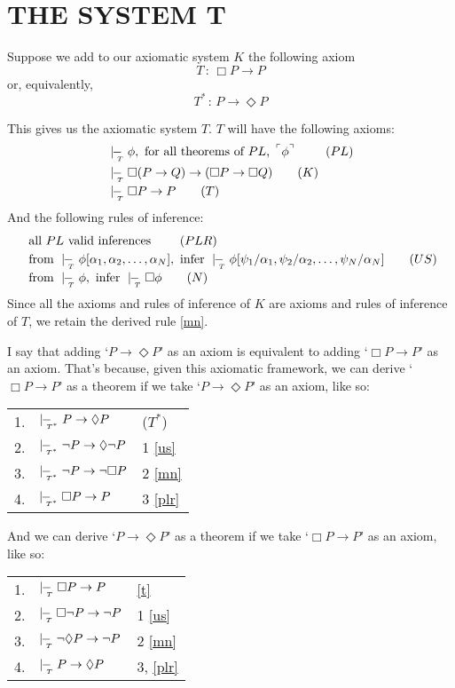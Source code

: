 \documentclass[landscape, two column, full page,reqno]{article}
\newcommand{\p}{\item}
\newcommand{\fns}[1]{{\footnotesize #1}}
\newcommand{\qq}[1]{ ~\!^\ulcorner #1  ^\urcorner~\!}
\newcommand{\tproves}{\mid\hspace{-3.9pt}-_{\!\!\!\raisebox{-3pt}{\text{\tiny$T$}}}\hspace{3pt}}
\newcommand{\tpproves}{\mid\hspace{-3.9pt}-_{\!\!\!\raisebox{-3pt}{\text{\tiny$T^*$}}}\hspace{3pt}}
\newcommand{\D}{\Diamond}
\newcommand{\B}{\Box}
\newcommand{\hs}{\hspace{2pt}}
\newcommand{\aproof}[2]{\begin{center}
\begin{tabularx}{#1}{l X l}
#2
\end{tabularx}
\end{center}}
\begin{document}
\section{T\fns{HE} S\fns{YSTEM} T}
\p Suppose we add to our axiomatic system  $K$ the following axiom
	\[
	T \hs:\hs \B P \to P
	\]
or, equivalently,	
	\[
	T^* \hs:\hs P \to \D P
	\]
	
\p This gives us the axiomatic system ${T}$.     $T$ will have the following axioms:
		\begin{align}
		& \tproves \phi, \text{ for all theorems of $PL$, $\qq{\phi}$ }			\tag{$PL$}\label{plt}	\\
		& \tproves\B( P \to Q) \to (\B P \to \B Q)	\tag{$K$}\label{k}	\\
		& \tproves \B P \to P			\tag{$T$} \label{t}	
		 \end{align}
And the following rules of inference:
		\begin{align}
		&\text{ all $PL$ valid inferences }	\tag{$PLR$}\label{plr}	\\
		&\text{ from } \tproves \phi[\alpha_1, \alpha_2, \dots, \alpha_N] , \text{ infer } \tproves \phi [\psi_1/\alpha_1, \psi_2/\alpha_2, \dots, \psi_N/\alpha_N]	\tag{$US$}\label{us}\\
		& \mbox{ from } \tproves \phi, \mbox{ infer } \tproves \B \phi \tag{$N$}\label{n}
		\end{align}
	Since all the axioms and rules of inference of $K$ are axioms and rules of inference of $T$, we retain the derived rule \eqref{mn}.
		
\p \label{31} I say that adding `$P \to \D P$' as an axiom is equivalent to adding `$\B P \to P$' as an axiom.  That's because, given this axiomatic framework, we can derive `$\B P \to P$' as a theorem if we take `$P \to \D P$' as an axiom, like so:
	\aproof{250pt}{
	1. & $\tpproves P \to \D P$				&	($T^*$)	\\
	2. & $\tpproves \neg P \to \D \neg P$		& 1 \eqref{us}	\\
	3. & $\tpproves \neg P \to \neg \B P$		& 2 \eqref{mn}	\\
	4. & $\tpproves \B P \to P$				& 3 \eqref{plr}
	}
And we can derive `$P \to \D P$' as a theorem if we take `$\B P \to P$' as an axiom, like so:
\begin{center}
\begin{tabularx}{250pt}{l X l}
1.& $\tproves \B P \to P$			&	\eqref{t}	\\
2. & $\tproves \B \neg P \to  \neg P$	& 1 \eqref{us}	\\
3. & $\tproves \neg \D P \to \neg  P$	& 2 \eqref{mn}	\\
4. & $\tproves P \to \D P$			&3, \eqref{plr}	
\end{tabularx}	
\end{center}
\end{document}
